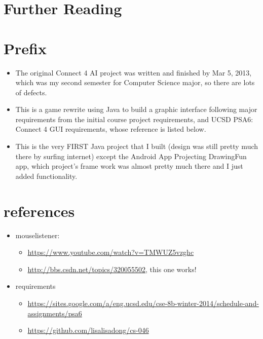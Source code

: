 \documentclass[9pt,b5paper]{article}
\begin{document}
\section{Further Reading}
\label{sec-6}

\section{Prefix}
\label{sec-7}
\begin{itemize}
\item The original Connect 4 AI project was written and finished by Mar 5, 2013, which was my second semester for Computer Science major, so there are lots of defects.
\item This is a game rewrite using Java to build a graphic interface following major requirements from the initial course project requirements, and UCSD PSA6: Connect 4 GUI requirements, whose reference is listed below.
\item This is the very FIRST Java project that I built (design was still pretty much there by surfing internet) except the Android App Projecting DrawingFun app, which project's frame work was almost pretty much there and I just added functionality.
\end{itemize}

\section{references}
\label{sec-8}
\begin{itemize}
\item mouselistener:
\begin{itemize}
\item \url{https://www.youtube.com/watch?v=TMWUZ5vzghc}
\item \url{http://bbs.csdn.net/topics/320055502}, this one works!
\end{itemize}
\item requirements
\begin{itemize}
\item \url{https://sites.google.com/a/eng.ucsd.edu/cse-8b-winter-2014/schedule-and-assignments/psa6}
\item \url{https://github.com/lisalisadong/cs-046}
\end{itemize}
\end{itemize}
\end{document}
